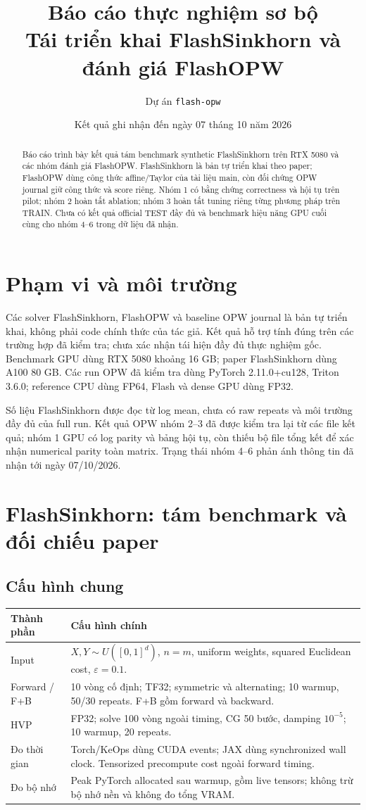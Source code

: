 \documentclass[11pt,a4paper]{article}
\title{Báo cáo thực nghiệm sơ bộ\\
  Tái triển khai FlashSinkhorn và đánh giá FlashOPW}
\author{Dự án \texttt{flash-opw}}
\date{Kết quả ghi nhận đến ngày 07 tháng 10 năm 2026}
\begin{document}
\maketitle
\begin{abstract}
Báo cáo trình bày kết quả tám benchmark synthetic FlashSinkhorn trên RTX 5080
và các nhóm đánh giá FlashOPW. FlashSinkhorn là bản tự triển khai theo paper;
FlashOPW dùng công thức affine/Taylor của tài liệu main, còn đối chứng OPW
journal giữ công thức và score riêng. Nhóm 1 có bằng chứng correctness và
hội tụ trên pilot; nhóm 2 hoàn tất ablation; nhóm 3 hoàn tất tuning riêng
từng phương pháp trên TRAIN. Chưa có kết quả official TEST đầy đủ và
benchmark hiệu năng GPU cuối cùng cho nhóm 4--6 trong dữ liệu đã nhận.
\end{abstract}
\tableofcontents
\newpage

\section{Phạm vi và môi trường}
Các solver FlashSinkhorn, FlashOPW và baseline OPW journal là bản tự triển
khai, không phải code chính thức của tác giả. Kết quả hỗ trợ tính đúng trên
các trường hợp đã kiểm tra; chưa xác nhận tái hiện đầy đủ thực nghiệm gốc.
Benchmark GPU dùng RTX 5080 khoảng 16 GB; paper FlashSinkhorn dùng A100 80 GB.
Các run OPW đã kiểm tra dùng PyTorch 2.11.0+cu128, Triton 3.6.0;
reference CPU dùng FP64, Flash và dense GPU dùng FP32.

Số liệu FlashSinkhorn được đọc từ log mean, chưa có raw repeats và môi trường
đầy đủ của full run. Kết quả OPW nhóm 2--3 đã được kiểm tra lại từ các file
kết quả; nhóm 1 GPU có log parity và bảng hội tụ, còn thiếu bộ file tổng kết
để xác nhận numerical parity toàn matrix. Trạng thái nhóm 4--6 phản ánh
thông tin đã nhận tới ngày 07/10/2026.

\section{FlashSinkhorn: tám benchmark và đối chiếu paper}
\label{sec:fs}
\subsection{Cấu hình chung}
\begin{tabularx}{\linewidth}{@{}lX@{}}
\toprule
Thành phần & Cấu hình chính \\
\midrule
Input & $X,Y\sim U([0,1]^d)$, $n=m$, uniform weights,
  squared Euclidean cost, $\varepsilon=0.1$. \\
Forward / F+B & 10 vòng cố định; TF32; symmetric và alternating;
  10 warmup, 50/30 repeats. F+B gồm forward và backward. \\
HVP & FP32; solve 100 vòng ngoài timing, CG 50 bước,
  damping $10^{-5}$; 10 warmup, 20 repeats. \\
Đo thời gian & Torch/KeOps dùng CUDA events; JAX dùng synchronized wall clock.
  Tensorized precompute cost ngoài forward timing. \\
Đo bộ nhớ & Peak PyTorch allocated sau warmup, gồm live tensors;
  không trừ bộ nhớ nền và không đo tổng VRAM. \\
\bottomrule
\end{tabularx}
\end{document}
